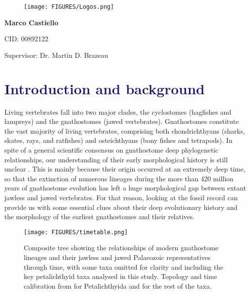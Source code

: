 \documentclass[11pt,letterpaper]{report}
\begin{document}
\begin{center}

\begin{figure}[!h]
\centering
    \texttt{[image: FIGURES/Logos.png]}
\end{figure}

\vspace{70mm}

\noindent{\huge{\textbf{\textcolor{MidnightBlue}{Braincase anatomy of petalichthyids: implications for early gnathostome phylogeny}}}}

\vspace{20mm}

{\large{\textbf{Marco Castiello}}} 

CID: 00892122

\end{center}
\vspace{50mm}
Supervisor: Dr. Martin D. Brazeau
\vspace{50mm}

\newpage
\chapter{\LARGE{\textcolor{MidnightBlue}{Introduction and background}}}
Living vertebrates fall into two major clades, the cyclostomes (hagfishes and lampreys) and the gnathostomes (jawed vertebrates). Gnathostomes constitute the vast majority of living vertebrates, comprising both chondrichthyans (sharks, skates, rays, and ratfishes) and osteichthyans (bony fishes and tetrapods). In spite of a general scientific consensus on gnathostome deep phylogenetic relationships, our understanding of their early morphological history is still unclear \citep{brazeau2015origin}. This is mainly because their origin occurred at an extremely deep time, so that the extinction of numerous lineages during the more than 420 million years of gnathostome evolution has left a huge morphological gap between extant jawless and jawed vertebrates. For that reason, looking at the fossil record can provide us with some essential clues about their deep evolutionary history and the morphology of the earliest gnathostomes and their relatives.

\begin{figure}[!h]
\centering
    \texttt{[image: FIGURES/timetable.png]}
\caption{\footnotesize{Composite tree showing the relationships of modern gnathostome lineages and their jawless and jawed Palaeozoic representatives through time, with some taxa omitted for clarity and including the key petalichthyid taxa analysed in this study. Topology and time calibration from \citealt{Zhu1996a} for Petalichthyida and \citealt{brazeau2015origin} for the rest of the taxa.}}
\label{gnathotable}
\end{figure}
\end{document}
